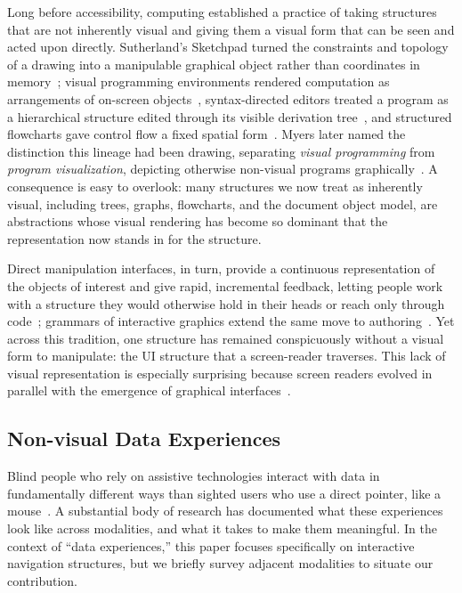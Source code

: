 \documentclass[12pt]{cmuthesis}
\begin{document}
Long before accessibility, computing established a practice of taking structures that are not inherently visual and giving them a visual form that can be seen and acted upon directly. Sutherland's Sketchpad turned the constraints and topology of a drawing into a manipulable graphical object rather than coordinates in memory~\cite{Sutherland1963Sketchpad}; visual programming environments rendered computation as arrangements of on-screen objects~\cite{Smith1977Pygmalion}, syntax-directed editors treated a program as a hierarchical structure edited through its visible derivation tree~\cite{Teitelbaum1981Cornell}, and structured flowcharts gave control flow a fixed spatial form~\cite{Nassi1973Flowchart}. Myers later named the distinction this lineage had been drawing, separating \textit{visual programming} from \textit{program visualization}, depicting otherwise non-visual programs graphically~\cite{Myers1990Taxonomies}. A consequence is easy to overlook: many structures we now treat as inherently visual, including trees, graphs, flowcharts, and the document object model, are abstractions whose visual rendering has become so dominant that the representation now stands in for the structure.

Direct manipulation interfaces, in turn, provide a continuous representation of the objects of interest and give rapid, incremental feedback, letting people work with a structure they would otherwise hold in their heads or reach only through code~\cite{Shneiderman1983DirectManip, Hutchins1985DirectManip}; grammars of interactive graphics extend the same move to authoring~\cite{Satyanarayan2017VegaLite, Bostock2011D3}. Yet across this tradition, one structure has remained conspicuously without a visual form to manipulate: the UI structure that a screen-reader traverses. This lack of visual representation is especially surprising because screen readers evolved in parallel with the emergence of graphical interfaces~\cite{Thatcher1994}.

\subsection{Non-visual Data Experiences}

Blind people who rely on assistive technologies interact with data in fundamentally different ways than sighted users who use a direct pointer, like a mouse~\cite{Marriott, Kim2021Accessible, Sharif2021}. A substantial body of research has documented what these experiences look like across modalities, and what it takes to make them meaningful. In the context of ``data experiences,'' this paper focuses specifically on interactive navigation structures, but we briefly survey adjacent modalities to situate our contribution.
\end{document}
